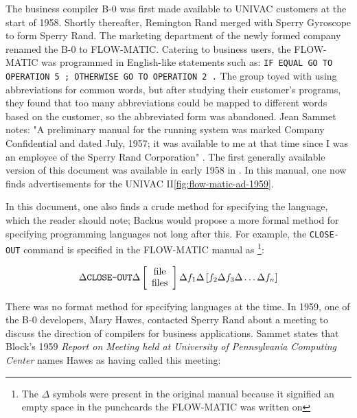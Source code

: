 The business compiler B-0 was first made available to UNIVAC customers
at the start of 1958.
Shortly thereafter, Remington Rand merged with Sperry Gyroscope to form Sperry Rand.
The marketing department of the newly formed company renamed the B-0
to FLOW-MATIC.
Catering to business users, the FLOW-MATIC was programmed in English-like
statements such as:
\texttt{IF EQUAL GO TO OPERATION 5 ; OTHERWISE GO TO OPERATION 2 .}
The group toyed with using abbreviations for common words, but
after studying their customer's programs, they found that too many
abbreviations could be mapped to different words based on the customer,
so the abbreviated form was abandoned.
Jean Sammet notes: "A preliminary manual
for the running system was marked Company Confidential and dated July,
1957; it was available to me at that time since I was an employee of the
Sperry Rand Corporation"
\cite{sammet_programming_languages_history_and_fundamentals_1969}.
The first generally available version of this document was available
in early 1958 in \cite{sperryrand_1959_flowmatic}.
In this manual, one now finds advertisements for the UNIVAC II\ref{fig:flow-matic-ad-1959}.

In this document, one also finds a crude method for specifying the language,
which the reader should note; Backus would propose a more formal method
for specifying programming languages not long after this.
For example, the \texttt{CLOSE-OUT} command is specified in the FLOW-MATIC manual as
\footnote{The $\Delta$ symbols were present in the original manual because it signified
an empty space in the punchcards the FLOW-MATIC was written on}:

\[
\Delta \text{\texttt{CLOSE-OUT}} \Delta
\left[
\begin{array}{c}
  \text{file} \\
  \text{files}
\end{array}
\right]
\Delta
f_1
\Delta
\left[
f_2
\Delta
f_3
\Delta
\dots
\Delta
f_n
\right]
\]

There was no format method for specifying languages at the time.
In 1959, one of the B-0 developers, Mary Hawes, contacted Sperry Rand about a meeting to
discuss the direction of compilers for business applications.
Sammet states\cite{sammet_early_history_of_cobol_1978} that Block's 1959 
\textit{Report on Meeting held at University of Pennsylvania Computing Center} names
Hawes as having called this meeting:

